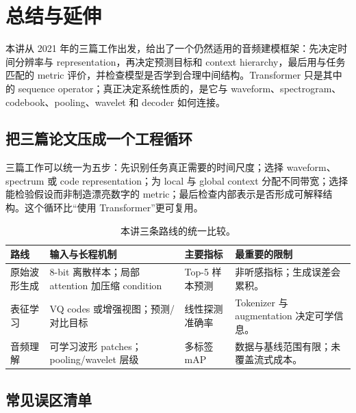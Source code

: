 \section{总结与延伸}

本讲从 2021 年的三篇工作出发，给出了一个仍然适用的音频建模框架：先决定时间分辨率与 representation，再决定预测目标和 context hierarchy，最后用与任务匹配的 metric 评价，并检查模型是否学到合理中间结构。Transformer 只是其中的 sequence operator；真正决定系统性质的，是它与 waveform、spectrogram、codebook、pooling、wavelet 和 decoder 如何连接。



\subsection{把三篇论文压成一个工程循环}

三篇工作可以统一为五步：先识别任务真正需要的时间尺度；选择 waveform、spectrum 或 code representation；为 local 与 global context 分配不同带宽；选择能检验假设而非制造漂亮数字的 metric；最后检查内部表示是否形成可解释结构。这个循环比“使用 Transformer”更可复用。

\begin{table}[H]
\centering
\small
\caption{本讲三条路线的统一比较。}
\begin{tabularx}{\textwidth}{L{0.17\textwidth}L{0.30\textwidth}L{0.18\textwidth}>{\raggedright\arraybackslash}X}
\toprule
路线 & 输入与长程机制 & 主要指标 & 最重要的限制 \\
\midrule
原始波形生成 & 8-bit 离散样本；局部 attention 加压缩 condition & Top-5 样本预测 & 非听感指标；生成误差会累积。 \\
表征学习 & VQ codes 或增强视图；预测/对比目标 & 线性探测准确率 & Tokenizer 与 augmentation 决定可学信息。 \\
音频理解 & 可学习波形 patches；pooling/wavelet 层级 & 多标签 mAP & 数据与基线范围有限；未覆盖流式成本。 \\
\bottomrule
\end{tabularx}
\end{table}

\subsection{常见误区清单}

